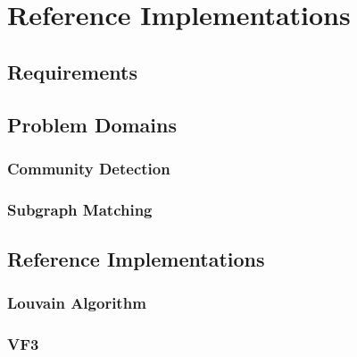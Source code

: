 \section{Reference Implementations}\label{section:implementations}

\subsection{Requirements}

\subsection{Problem Domains}

\subsubsection{Community Detection}

\subsubsection{Subgraph Matching}

\subsection{Reference Implementations}

\subsubsection{Louvain Algorithm}

\subsubsection{VF3}